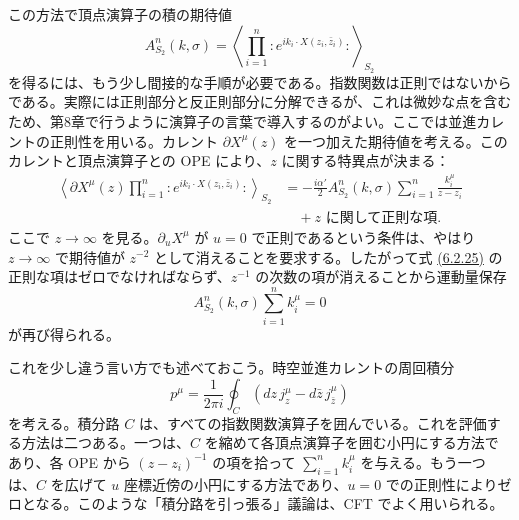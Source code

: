 この方法で頂点演算子の積の期待値
\begin{equation}
A_{S_2}^n(k,\sigma)=\left\langle\prod_{i=1}^n:e^{ik_i\cdot X(z_i,\bar z_i)}:\right\rangle_{S_2}
\tag{6.2.24}\label{eq:6.2.24}
\end{equation}
を得るには、もう少し間接的な手順が必要である。指数関数は正則ではないからである。実際には正則部分と反正則部分に分解できるが、これは微妙な点を含むため、第8章で行うように演算子の言葉で導入するのがよい。ここでは並進カレントの正則性を用いる。カレント $\partial X^\mu(z)$ を一つ加えた期待値を考える。このカレントと頂点演算子との OPE により、$z$ に関する特異点が決まる：
\begin{equation}
\begin{aligned}
\left\langle\partial X^\mu(z)\prod_{i=1}^n:e^{ik_i\cdot X(z_i,\bar z_i)}:\right\rangle_{S_2}
&=-\frac{i\alpha'}2A_{S_2}^n(k,\sigma)\sum_{i=1}^n\frac{k_i^\mu}{z-z_i}\\
&\quad+\text{$z$ に関して正則な項}.
\end{aligned}
\tag{6.2.25}\label{eq:6.2.25}
\end{equation}
ここで $z\to\infty$ を見る。$\partial_uX^\mu$ が $u=0$ で正則であるという条件は、やはり $z\to\infty$ で期待値が $z^{-2}$ として消えることを要求する。したがって式 \hyperref[eq:6.2.25]{(6.2.25)} の正則な項はゼロでなければならず、$z^{-1}$ の次数の項が消えることから運動量保存
\begin{equation}
A_{S_2}^n(k,\sigma)\sum_{i=1}^n k_i^\mu=0
\tag{6.2.26}\label{eq:6.2.26}
\end{equation}
が再び得られる。

これを少し違う言い方でも述べておこう。時空並進カレントの周回積分
\begin{equation}
p^\mu=\frac1{2\pi i}\oint_C(dz\,j_z^\mu-d\bar z\,j_{\bar z}^\mu)
\tag{6.2.27}\label{eq:6.2.27}
\end{equation}
を考える。積分路 $C$ は、すべての指数関数演算子を囲んでいる。これを評価する方法は二つある。一つは、$C$ を縮めて各頂点演算子を囲む小円にする方法であり、各 OPE から $(z-z_i)^{-1}$ の項を拾って $\sum_{i=1}^n k_i^\mu$ を与える。もう一つは、$C$ を広げて $u$ 座標近傍の小円にする方法であり、$u=0$ での正則性によりゼロとなる。このような「積分路を引っ張る」議論は、CFT でよく用いられる。

